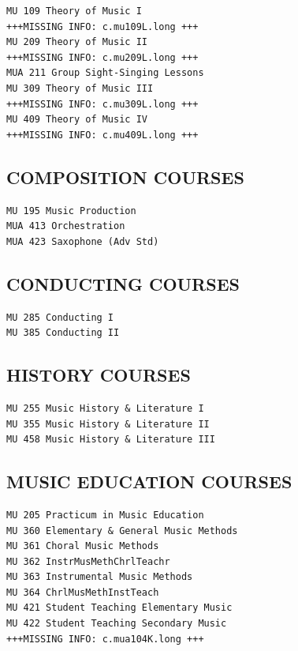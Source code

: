\documentclass[
  letterpaper,
]{scrbook}
\begin{document}
\begin{verbatim}
MU 109 Theory of Music I
+++MISSING INFO: c.mu109L.long +++
MU 209 Theory of Music II
+++MISSING INFO: c.mu209L.long +++
MUA 211 Group Sight-Singing Lessons
MU 309 Theory of Music III
+++MISSING INFO: c.mu309L.long +++
MU 409 Theory of Music IV
+++MISSING INFO: c.mu409L.long +++
\end{verbatim}

\subsection{COMPOSITION COURSES}\label{composition-courses}

\begin{verbatim}
MU 195 Music Production
MUA 413 Orchestration
MUA 423 Saxophone (Adv Std)
\end{verbatim}

\subsection{CONDUCTING COURSES}\label{conducting-courses}

\begin{verbatim}
MU 285 Conducting I
MU 385 Conducting II
\end{verbatim}

\subsection{HISTORY COURSES}\label{history-courses}

\begin{verbatim}
MU 255 Music History & Literature I
MU 355 Music History & Literature II
MU 458 Music History & Literature III
\end{verbatim}

\subsection{MUSIC EDUCATION COURSES}\label{music-education-courses}

\begin{verbatim}
MU 205 Practicum in Music Education
MU 360 Elementary & General Music Methods
MU 361 Choral Music Methods
MU 362 InstrMusMethChrlTeachr
MU 363 Instrumental Music Methods
MU 364 ChrlMusMethInstTeach
MU 421 Student Teaching Elementary Music
MU 422 Student Teaching Secondary Music
+++MISSING INFO: c.mua104K.long +++
\end{verbatim}
\end{document}
